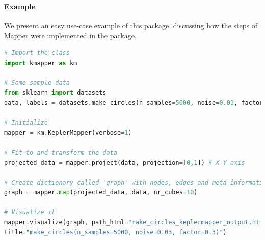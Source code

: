 \paragraph{Example}
We present an easy use-case example of this package, discussing how the steps of Mapper were implemented in the package.
\begin{lstlisting}[language=Python, caption=Kepler Mapper example]
# Import the class
import kmapper as km

# Some sample data
from sklearn import datasets
data, labels = datasets.make_circles(n_samples=5000, noise=0.03, factor=0.3)

# Initialize
mapper = km.KeplerMapper(verbose=1)

# Fit to and transform the data
projected_data = mapper.project(data, projection=[0,1]) # X-Y axis

# Create dictionary called 'graph' with nodes, edges and meta-information
graph = mapper.map(projected_data, data, nr_cubes=10)

# Visualize it
mapper.visualize(graph, path_html="make_circles_keplermapper_output.html",
title="make_circles(n_samples=5000, noise=0.03, factor=0.3)")
\end{lstlisting}
